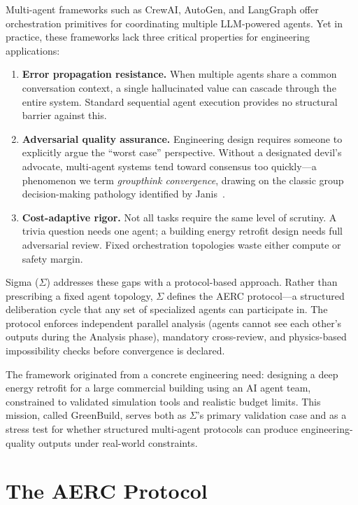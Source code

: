 \documentclass[11pt,a4paper]{article}
\begin{document}
Multi-agent frameworks such as CrewAI, AutoGen, and LangGraph offer orchestration primitives for coordinating multiple LLM-powered agents. Yet in practice, these frameworks lack three critical properties for engineering applications:

\begin{enumerate}
    \item \textbf{Error propagation resistance.} When multiple agents share a common conversation context, a single hallucinated value can cascade through the entire system. Standard sequential agent execution provides no structural barrier against this.
    \item \textbf{Adversarial quality assurance.} Engineering design requires someone to explicitly argue the ``worst case'' perspective. Without a designated devil's advocate, multi-agent systems tend toward consensus too quickly---a phenomenon we term \emph{groupthink convergence}, drawing on the classic group decision-making pathology identified by Janis~\cite{janis1972}.
    \item \textbf{Cost-adaptive rigor.} Not all tasks require the same level of scrutiny. A trivia question needs one agent; a building energy retrofit design needs full adversarial review. Fixed orchestration topologies waste either compute or safety margin.
\end{enumerate}

Sigma ($\Sigma$) addresses these gaps with a protocol-based approach. Rather than prescribing a fixed agent topology, $\Sigma$ defines the AERC protocol---a structured deliberation cycle that any set of specialized agents can participate in. The protocol enforces independent parallel analysis (agents cannot see each other's outputs during the Analysis phase), mandatory cross-review, and physics-based impossibility checks before convergence is declared.

The framework originated from a concrete engineering need: designing a deep energy retrofit for a large commercial building using an AI agent team, constrained to validated simulation tools and realistic budget limits. This mission, called GreenBuild, serves both as $\Sigma$'s primary validation case and as a stress test for whether structured multi-agent protocols can produce engineering-quality outputs under real-world constraints.

\section{The AERC Protocol}
\end{document}
